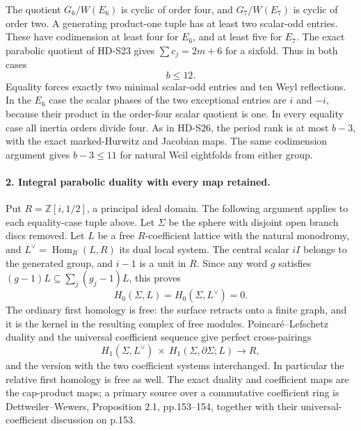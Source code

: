 The quotient \(G_6/W(E_6)\) is cyclic of order four, and
\(G_7/W(E_7)\) is cyclic of order two. A generating product-one
tuple has at least two scalar-odd entries. These have codimension
at least four for \(E_6\), and at least five for \(E_7\).
The exact parabolic quotient of HD-S23 gives
\(\sum c_j=2m+6\) for a sixfold. Thus in both cases
\[
 b\le12.
\]
Equality forces exactly two minimal scalar-odd entries and ten Weyl
reflections. In the \(E_6\) case the scalar phases of the two
exceptional entries are \(i\) and \(-i\), because their product
in the order-four scalar quotient is one. In every equality case
all inertia orders divide four. As in HD-S26, the period rank is at
most \(b-3\), with the exact marked-Hurwitz and Jacobian maps.
The same codimension argument gives \(b-3\le11\) for natural
Weil eightfolds from either group.

\paragraph{2. Integral parabolic duality with every map retained.}
Put \(R=\mathbb Z[i,1/2]\), a principal ideal domain. The following
argument applies to each equality-case tuple above. Let \(\Sigma\)
be the sphere with disjoint open branch discs removed. Let \(L\)
be a free \(R\)-coefficient lattice with the natural monodromy,
and \(L^\vee=\operatorname{Hom}_R(L,R)\) its dual local system.
The central scalar \(iI\) belongs to the generated group, and
\(i-1\) is a unit in \(R\). Since any word \(g\) satisfies
\((g-1)L\subseteq\sum_j(g_j-1)L\), this proves
\[
 H_0(\Sigma,L)=H_0(\Sigma,L^\vee)=0.
\]
The ordinary first homology is free: the surface retracts onto a
finite graph, and it is the kernel in the resulting complex of free
modules. Poincar\'e--Lefschetz duality and the universal coefficient
sequence give perfect cross-pairings
\[
 H_1(\Sigma,L^\vee)\ \times\
 H_1(\Sigma,\partial\Sigma;L)\longrightarrow R,
\]
and the version with the two coefficient systems interchanged. In
particular the relative first homology is free as well. The exact
duality and coefficient maps are the cap-product maps; a primary
source over a commutative coefficient ring is Dettweiler--Wewers,
Proposition 2.1, pp.153--154, together with their universal-coefficient
discussion on p.153.

